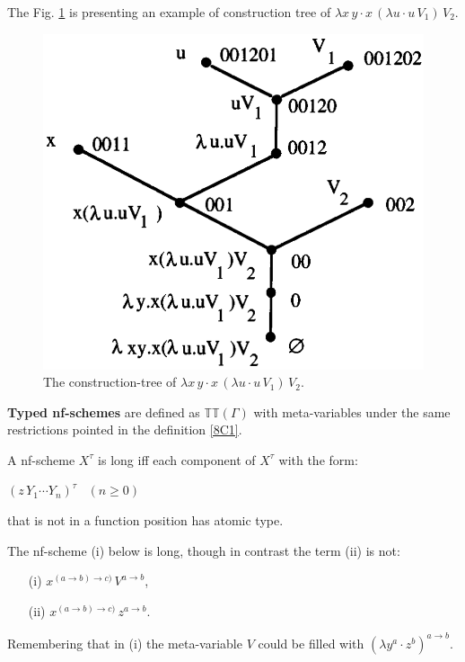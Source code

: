 \documentclass[a4paper,10pt]{article}
\begin{document}
The Fig. \ref{Fig4} is presenting an example of construction tree of $\lambda x\,y\cdot x\,(\lambda u\cdot u\,V_1)\,V_2$.

\begin{figure}[h]
   \centering
   \includegraphics[scale=0.5]{fig4.png}
    \caption{The construction-tree of $\lambda x\,y\cdot x\,(\lambda u\cdot u\,V_1)\,V_2$.}
   \label{Fig4}
\end{figure}


\begin{mydef}
 \textbf{Typed nf-schemes} are defined as $\mathbb{TT}(\Gamma)$ with meta-variables under the same restrictions pointed in the definition \ref{8C1}.
\end{mydef}

\begin{mydef}\label{8C4}
  A nf-scheme $X^{\tau}$ is long iff each component of $X^{\tau}$ with the form:

  \begin{center}
        $(z\,Y_1 \cdots Y_n)^{\tau}\,\,\,\,\,(n \geq 0)$
  \end{center}
   that is not in a function position has atomic type.
\end{mydef}

\begin{exa} The nf-scheme (i) below is long, though in contrast the term (ii) is not:
\begin{itemize}
 \item[(i)] $x^{(a\to b)\to c)}\,V^{a\to b}$,
 \item[(ii)] $x^{(a\to b)\to c)}\,z^{a\to b}$.
\end{itemize}
Remembering that in (i) the meta-variable $V$ could be filled with $(\lambda y^a \cdot z^b)^{a\to b}$.
\end{exa}
\end{document}
